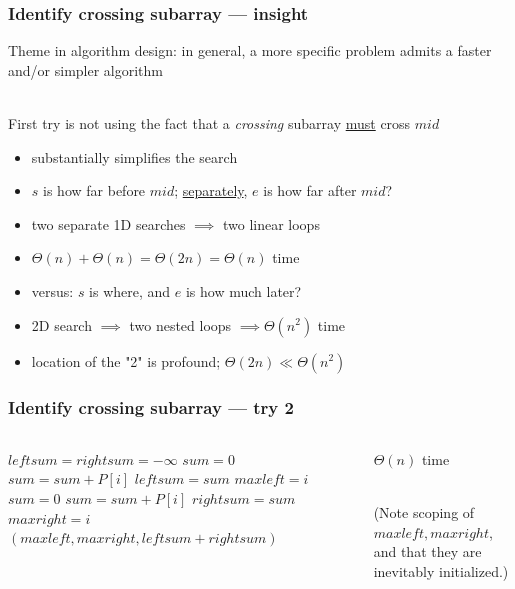 \documentclass{beamer}
\newcommand{\stanza}{ \\~\ }
\begin{document}
\begin{frame} \frametitle{Identify crossing subarray --- insight}
Theme in algorithm design: in general, a more specific problem admits a
  faster and/or simpler algorithm \stanza

First try is not using the fact that a \emph{crossing} subarray
\underline{must} cross $mid$
\begin{itemize}
  \item substantially simplifies the search
  \item $s$ is how far before $mid$; \underline{separately}, $e$ is how far after $mid$?
  \item two separate 1D searches $\implies$ two linear loops
  \item $\Theta(n)+\Theta(n) = \Theta(2n) = \Theta(n)$ time
  \item versus: $s$ is where, and $e$ is how much later?
  \item 2D search $\implies$ two nested loops $\implies \Theta(n^2)$ time
  \item location of the "2" is profound; $\Theta(2n) \ll \Theta(n^2)$
\end{itemize}
\end{frame}

\begin{frame} \frametitle{Identify crossing subarray --- try 2}
\begin{columns}
\begin{column}{0.6\textwidth}
  {\tiny
  \begin{algorithmic}[1]
    \State $leftsum = rightsum = -\infty$
    \State $sum = 0$
      \State $sum = sum + P[i]$
        \State $leftsum = sum$
        \State $maxleft = i$
      \EndIf
    \EndFor
    \State $sum = 0$
      \State $sum = sum + P[i]$
        \State $rightsum = sum$
        \State $maxright = i$
      \EndIf
    \EndFor
    \State \Return $(maxleft, maxright, leftsum + rightsum)$
    \EndFunction
  \end{algorithmic}
  }
\end{column}
\begin{column}{0.4\textwidth}
  $\Theta(n)$ time \stanza

  (Note scoping of $maxleft, maxright$, and that they are inevitably initialized.)
\end{column}
\end{columns}
\end{frame}
\end{document}
